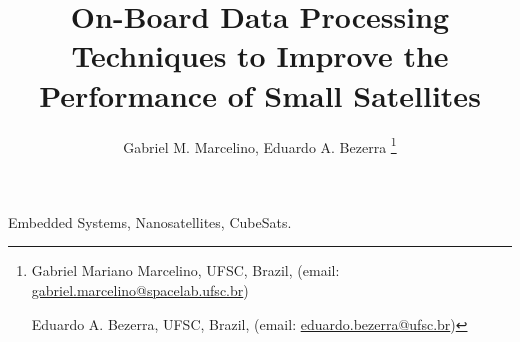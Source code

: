 \documentclass[journal]{IEEEtran}
\title{On-Board Data Processing Techniques to Improve the Performance of Small Satellites}
\author{Gabriel M. Marcelino, Eduardo A. Bezerra
	\thanks{
	Gabriel Mariano Marcelino, UFSC, Brazil, (email: \href{mailto:gabriel.marcelino@spacelab.ufsc.br}{gabriel.marcelino@spacelab.ufsc.br})

	Eduardo A. Bezerra, UFSC, Brazil, (email: \href{mailto:eduardo.bezerra@ufsc.br}{eduardo.bezerra@ufsc.br})
	}}
\date{}
\begin{document}
    \maketitle

    \begin{abstract}
    \end{abstract}

    \begin{IEEEkeywords}
        Embedded Systems, Nanosatellites, CubeSats.
    \end{IEEEkeywords}

    
    
    
    
\end{document}
